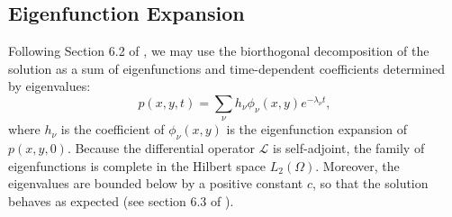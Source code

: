 \subsection{Eigenfunction Expansion} \label{sec:eigenfunction}
Following Section 6.2 of \cite{risken1989fokker-planck}, we may use
the biorthogonal decomposition of the solution as a sum of
eigenfunctions and time-dependent coefficients determined by eigenvalues:
\begin{equation}
  p(x,y,t) =  \sum_\nu h_\nu \phi_\nu (x, y) e^{-\lambda_\nu t}, \label{eq:biorthogonal}
\end{equation}
where $h_\nu$ is the coefficient of $\phi_\nu(x, y)$ is the
eigenfunction expansion of $p(x,y,0)$. Because the differential
operator $\mathcal{L}$ is self-adjoint, the family of eigenfunctions
is complete in the Hilbert space $L_2(\Omega)$. Moreover, the
eigenvalues are bounded below by a positive constant $c$, so that the
solution behaves as expected (see section 6.3 of
\cite{risken1989fokker-planck}).

